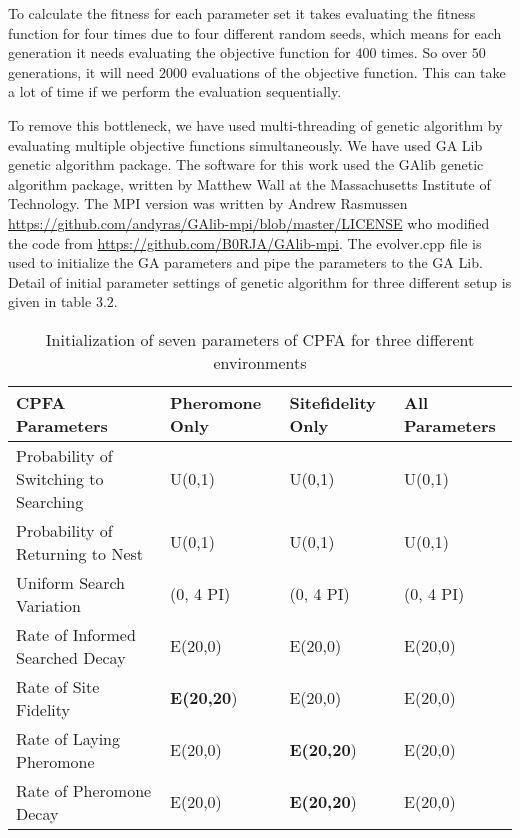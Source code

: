 To calculate the fitness for each parameter set it takes evaluating the fitness function for four times due to four different random seeds, which means for each generation it needs evaluating the objective function for $400$ times. So over $50$ generations, it will need $2000$ evaluations of the objective function. This can take a lot of time if we perform the evaluation sequentially.\par 
To remove this bottleneck, we have used multi-threading of genetic algorithm by evaluating multiple objective functions simultaneously. We have used GA Lib genetic algorithm package. The software for this work used the GAlib genetic algorithm package, written by Matthew Wall at the Massachusetts Institute of Technology. The MPI version was written by Andrew Rasmussen \url{https://github.com/andyras/GAlib-mpi/blob/master/LICENSE} who modified the code from \url{https://github.com/B0RJA/GAlib-mpi}.
The evolver.cpp file is used to initialize the GA parameters and pipe the parameters to the GA Lib.
Detail of initial parameter settings of genetic algorithm for three different setup is given in table $3.2$.
\begin{table}[h]
	\begin{tabular}{ |p{}|p{}|p{}|p{}| } 
		\hline
		\textbf{CPFA Parameters} & \textbf{Pheromone Only} & \textbf{Sitefidelity Only} & \textbf{All Parameters} \\
		\hline 
		Probability of Switching to Searching & U(0,1) & U(0,1) & U(0,1)\\ 
		\hline
		Probability of Returning to Nest & U(0,1) & U(0,1) & U(0,1)\\ 
		\hline
		Uniform Search Variation & (0, 4 PI) & (0, 4 PI) & (0, 4 PI)\\
		\hline
		Rate of Informed Searched Decay & E(20,0) & E(20,0) & E(20,0)\\
		\hline
		Rate of Site Fidelity & \textbf{E(20,20}) & E(20,0) & E(20,0)\\
		\hline
		Rate of Laying Pheromone & E(20,0) & \textbf{E(20,20}) & E(20,0)\\
		\hline
		Rate of Pheromone Decay & E(20,0) & \textbf{E(20,20}) & E(20,0)\\
		\hline
	\end{tabular}
	\caption{Initialization of seven parameters of CPFA for three different environments}
\end{table}
